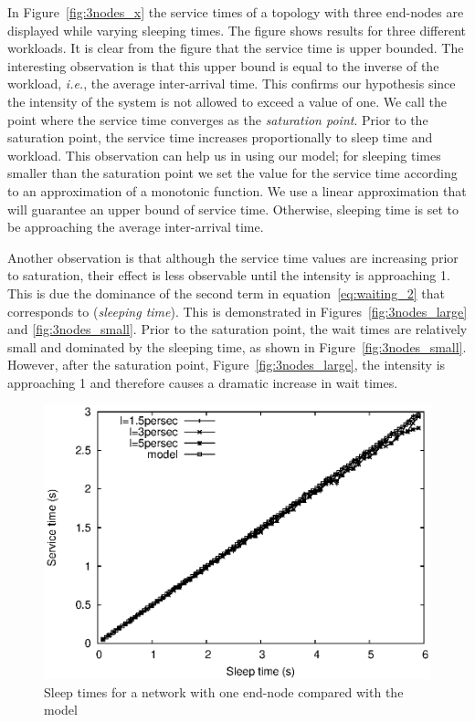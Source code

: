 In Figure~\ref{fig:3nodes_x} the service times of a topology with three end-nodes are displayed while varying sleeping times. The figure shows results for three different workloads. It is clear from the figure that the service time is upper bounded. The interesting observation is that this upper bound is equal to the inverse of the workload, \emph{i.e.}, the average inter-arrival time. This confirms our hypothesis since the intensity of the system is not allowed to exceed a value of one. We call the point where the service time converges as the \emph{saturation point}. Prior to the saturation point, the service time increases proportionally to sleep time and workload. This observation can help us in using our model; for sleeping times smaller than the saturation point we set the value for the service time according to an approximation of a monotonic function. We use a linear approximation that will guarantee an upper bound of service time. Otherwise, sleeping time is set to be approaching the average inter-arrival time.

Another observation is that although the service time values are increasing prior to saturation, their effect is less observable until the intensity is approaching 1. This is due the dominance of the second term in equation~\ref{eq:waiting_2} that corresponds to (\emph{sleeping time}). This is demonstrated in Figures~\ref{fig:3nodes_large} and \ref{fig:3nodes_small}. Prior to the saturation point, the wait times are relatively small and dominated by the sleeping time, as shown in Figure~\ref{fig:3nodes_small}. However, after the saturation point, Figure~\ref{fig:3nodes_large}, the intensity is approaching 1 and therefore causes a dramatic increase in wait times.

\begin{figure}[t]
\centering
\includegraphics[scale=0.65]{figures/1node_varySleep_sim.eps}
\caption{Sleep times for a network with one end-node compared with the model}
\label{fig:1node}
\end{figure}


